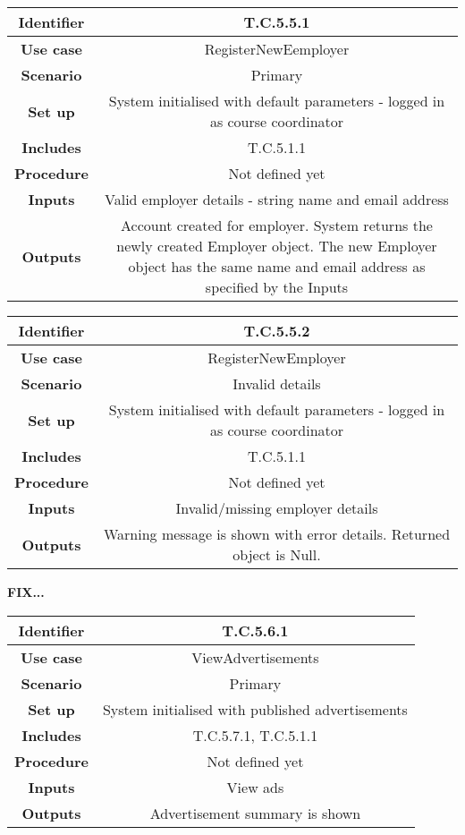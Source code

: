 \begin{tabular}{|c|c|}
\hline \textbf{Identifier} & T.C.5.5.1\\
\hline \textbf{Use case} & RegisterNewEemployer\\
\hline \textbf{Scenario} & Primary\\
\hline \textbf{Set up} & System initialised with default parameters - logged in as course coordinator\\
\hline \textbf{Includes} & T.C.5.1.1\\
\hline \textbf{Procedure} & Not defined yet\\
\hline \textbf{Inputs} & Valid employer details - string name and email address\\
\hline \textbf{Outputs} & Account created for employer. System returns the newly created Employer object. The new Employer object has the same name and email address as specified by the Inputs\\
\hline
\end{tabular}

\begin{tabular}{|c|c|}
\hline \textbf{Identifier} & T.C.5.5.2\\
\hline \textbf{Use case} & RegisterNewEmployer\\
\hline \textbf{Scenario} & Invalid details\\
\hline \textbf{Set up} & System initialised with default parameters - logged in as course coordinator\\
\hline \textbf{Includes} & T.C.5.1.1\\
\hline \textbf{Procedure} & Not defined yet\\
\hline \textbf{Inputs} & Invalid/missing employer details\\
\hline \textbf{Outputs} & Warning message is shown with error details. Returned object is Null.\\
\hline
\end{tabular}

\textbf{FIX...}
\begin{tabular}{|c|c|}
\hline \textbf{Identifier} & T.C.5.6.1\\
\hline \textbf{Use case} & ViewAdvertisements\\
\hline \textbf{Scenario} & Primary\\
\hline \textbf{Set up} & System initialised with published advertisements\\
\hline \textbf{Includes} & T.C.5.7.1, T.C.5.1.1\\
\hline \textbf{Procedure} & Not defined yet\\
\hline \textbf{Inputs} & View ads\\
\hline \textbf{Outputs} & Advertisement summary is shown\\
\hline
\end{tabular}


